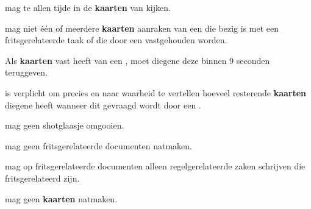 
\vervolgLijst{}
\item \EenSpeler mag te allen tijde in de \textbf{kaarten} van \alleSpelers kijken.
\eindLijst{}

\vervolgLijst{}
\item \EenSpeler mag niet \'e\'en of meerdere \textbf{kaarten} aanraken van een \medeSpeler die bezig is met een fritsgerelateerde taak of die door een \medeSpeler vastgehouden worden.
\eindLijst{}

\vervolgLijst{}
\item Als \eenSpeler \textbf{kaarten} vast heeft van een \medeSpelerN, moet diegene deze binnen 9 seconden teruggeven.
\eindLijst{}

\vervolgLijst{}
\item \EenSpeler is verplicht om precies en naar waarheid te vertellen hoeveel resterende \textbf{kaarten} diegene heeft wanneer dit gevraagd wordt door een \medeSpelerN.
\eindLijst{}


\newpage
{}
\label{sec:algemeen_einde}



\vervolgLijst{}
\item \EenSpeler mag geen shotglaasje omgooien.
\eindLijst{}

\vervolgLijst{}
\item \EenSpeler mag geen fritsgerelateerde documenten natmaken.
\eindLijst{}

\vervolgLijst{}
\item \EenSpeler mag op fritsgerelateerde documenten alleen regelgerelateerde zaken schrijven die fritsgerelateerd zijn.
\eindLijst{}

\vervolgLijst{}
\item \EenSpeler mag geen \textbf{kaarten} natmaken.
\eindLijst{}


